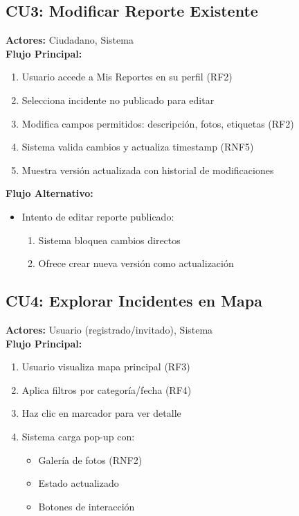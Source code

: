 \begin{multicols}{2}
\subsection*{CU3: Modificar Reporte Existente}
\textbf{Actores:} Ciudadano, Sistema\\
\textbf{Flujo Principal:}
\begin{enumerate}
    \item Usuario accede a Mis Reportes en su perfil (RF2)
    \item Selecciona incidente no publicado para editar
    \item Modifica campos permitidos: descripción, fotos, etiquetas (RF2)
    \item Sistema valida cambios y actualiza timestamp (RNF5)
    \item Muestra versión actualizada con historial de modificaciones
\end{enumerate}

\textbf{Flujo Alternativo:}
\begin{itemize}
    \item Intento de editar reporte publicado:
    \begin{enumerate}
        \item Sistema bloquea cambios directos
        \item Ofrece crear nueva versión como actualización
    \end{enumerate}
\end{itemize}

\subsection*{CU4: Explorar Incidentes en Mapa}
\textbf{Actores:} Usuario (registrado/invitado), Sistema\\
\textbf{Flujo Principal:}
\begin{enumerate}
    \item Usuario visualiza mapa principal (RF3)
    \item Aplica filtros por categoría/fecha (RF4)
    \item Haz clic en marcador para ver detalle
    \item Sistema carga pop-up con:
    \begin{itemize}
        \item Galería de fotos (RNF2)
        \item Estado actualizado
        \item Botones de interacción
    \end{itemize}
\end{enumerate}


\end{multicols}
